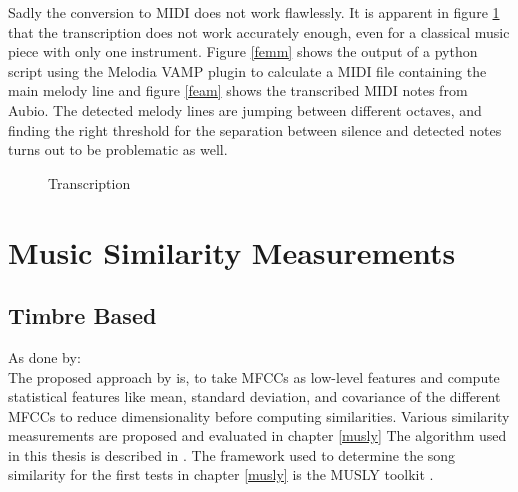 \noindent Sadly the conversion to MIDI does not work flawlessly. It is apparent in figure \ref{fig:transc} that the transcription does not work accurately enough, even for a classical music piece with only one instrument. Figure \ref{femm} shows the output of a python script using the Melodia VAMP plugin to calculate a MIDI file containing the main melody line and figure \ref{feam} shows the transcribed MIDI notes from Aubio. The detected melody lines are jumping between different octaves, and finding the right threshold for the separation between silence and detected notes turns out to be problematic as well.

\begin{figure}[htbp]
	\centering
	\caption{Transcription}
	\label{fig:transc}
\end{figure}
\FloatBarrier 

\section{Music Similarity Measurements}

\subsection{Timbre Based}

As done by: \cite{schnitzer1}\\
The proposed approach by \cite{schnitzer1} is, to take MFCCs as low-level features and compute statistical features like mean, standard deviation, and covariance of the different MFCCs to reduce dimensionality before computing similarities.
Various similarity measurements are proposed and evaluated in chapter \ref{musly}
The algorithm used in this thesis is described in \cite[pp. 17ff]{schnitzer1}. The framework used to determine the song similarity for the first tests in chapter \ref{musly} is the MUSLY toolkit \cite{musly1}. 

